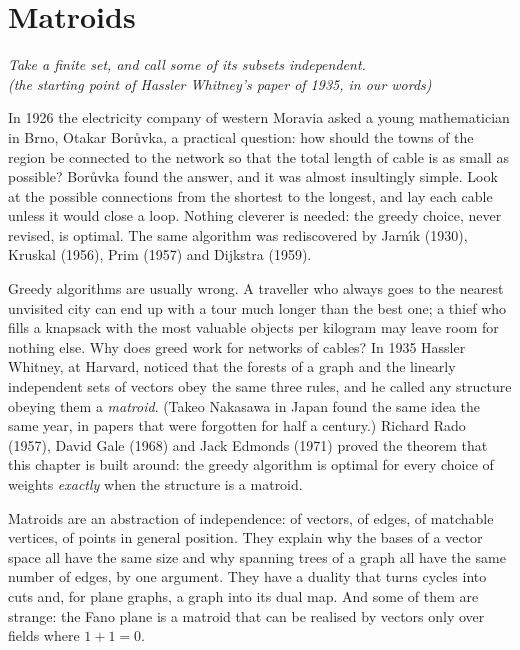 \chapter{Matroids}

\begin{center}\itshape
Take a finite set, and call some of its subsets independent.\\
\upshape(the starting point of Hassler Whitney's paper of 1935, in our words)
\end{center}

In 1926 the electricity company of western Moravia asked a young mathematician in Brno, Otakar Bor\r{u}vka, a practical
question: how should the towns of the region be connected to the network so that the total length of cable is as small
as possible? Bor\r{u}vka found the answer, and it was almost insultingly simple. Look at the possible connections from the
shortest to the longest, and lay each cable unless it would close a loop. Nothing cleverer is needed: the greedy choice,
never revised, is optimal. The same algorithm was rediscovered by Jarn\'\i k (1930), Kruskal (1956), Prim (1957) and Dijkstra (1959).

Greedy algorithms are usually wrong. A traveller who always goes to the nearest unvisited city can end up with a tour much longer
than the best one; a thief who fills a knapsack with the most valuable objects per kilogram may leave room for nothing
else. Why does greed work for networks of cables? In 1935 Hassler Whitney, at Harvard, noticed that the forests of a graph and
the linearly independent sets of vectors obey the same three rules, and he called any structure obeying them a
\emph{matroid}. (Takeo Nakasawa in Japan found the same idea the same year, in papers that were forgotten for half a century.)
Richard Rado (1957), David Gale (1968) and Jack Edmonds (1971) proved the theorem that this chapter is built around: the greedy algorithm is optimal for
every choice of weights \emph{exactly} when the structure is a matroid.

Matroids are an abstraction of independence: of vectors, of edges, of matchable vertices, of points in general position.
They explain why the bases of a vector space all have the same size and why spanning trees of a graph all have the same number
of edges, by one argument. They have a duality that turns cycles into cuts and, for plane graphs, a graph into its dual map.
And some of them are strange: the Fano plane is a matroid that can be realised by vectors only over fields where $1+1=0$.

